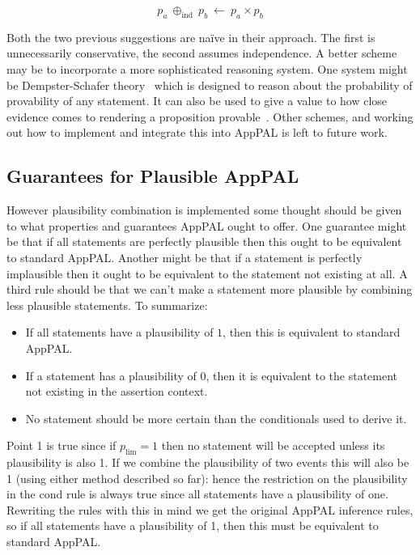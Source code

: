 \documentclass[thesis.tex]{subfiles}
\begin{document}
\begin{equation*}
  p_a~\oplus_{\text{ind}}~p_b~\gets~p_a\times p_b
\end{equation*}

Both the two previous suggestions are na\"ive in their approach.  The
first is unnecessarily conservative, the second assumes independence.
A better scheme may be to incorporate a more sophisticated reasoning
system.  One system might be Dempster-Schafer
theory~\cite{dempster_upper_1967,glenn_shafer_mathematical_1976} which
is designed to reason about the probability of provability of any
statement. It can also be used to give a value to how close evidence
comes to rendering a proposition
provable~\cite{pearl_probabilistic_2014}. Other schemes, and working
out how to implement and integrate this into AppPAL is left to future work.

\subsection{Guarantees for Plausible AppPAL} 

However plausibility combination is implemented some thought should be
given to what properties and guarantees AppPAL ought to offer.  One
guarantee might be that if all statements are perfectly plausible then
this ought to be equivalent to standard AppPAL.  Another might be that
if a statement is perfectly implausible then it ought to be equivalent
to the statement not existing at all. A third rule should be that we
can't make a statement more plausible by combining less plausible
statements.  To summarize:

\begin{itemize}
\item If all statements have a plausibility of $1$, then this is
  equivalent to standard AppPAL.
\item If a statement has a plausibility of $0$, then it is equivalent
  to the statement not existing in the assertion context.
\item No statement should be more certain than the conditionals used
  to derive it.
\end{itemize}

Point 1 is true since if $p_{\text{lim}} = 1$ then no statement will
be accepted unless its plausibility is also 1.  If we combine the
plausibility of two events this will also be 1 (using either method
described so far): hence the restriction on the plausibility in the
cond rule is always true since all statements have a plausibility of
one.  Rewriting the rules with this in mind we get the original AppPAL
inference rules, so if all statements have a plausibility of 1, then
this must be equivalent to standard AppPAL.
\end{document}

